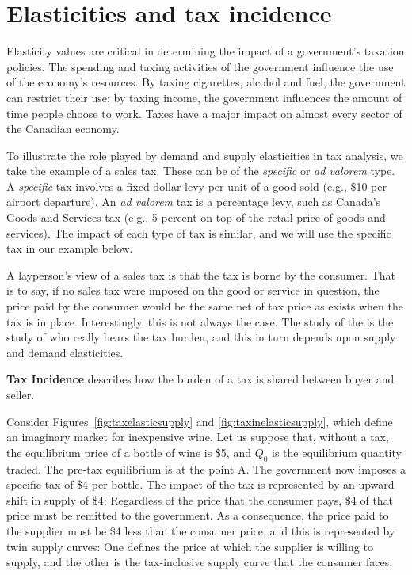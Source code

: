 \section{Elasticities and tax incidence}\label{sec:ch4sec7}

Elasticity values are critical in determining the impact of a government's
taxation policies. The spending and taxing activities of the government
influence the use of the economy's resources. By taxing cigarettes, alcohol
and fuel, the government can restrict their use; by taxing income, the
government influences the amount of time people choose to work. Taxes have a
major impact on almost every sector of the Canadian economy.

To illustrate the role played by demand and supply elasticities in tax
analysis, we take the example of a sales tax. These can be of the \textit{%
specific} or \textit{ad valorem} type. A \textit{specific} tax involves a
fixed dollar levy per unit of a good sold (e.g., \$10 per airport
departure). An \textit{ad valorem} tax is a percentage levy, such as
Canada's Goods and Services tax (e.g., 5 percent on top of the retail price
of goods and services). The impact of each type of tax is similar, and we
will use the specific tax in our example below.

A layperson's view of a sales tax is that the tax is borne by the consumer.
That is to say, if no sales tax were imposed on the good or service in
question, the price paid by the consumer would be the same net of tax price
as exists when the tax is in place. Interestingly, this is not always the
case. The study of the  is the study of who
really bears the tax burden, and this in turn depends upon supply and demand
elasticities.

\begin{DefBox}
\textbf{Tax Incidence} describes how the burden of a tax is shared between buyer and seller.
\end{DefBox}

\newhtmlpage

Consider Figures~\ref{fig:taxelasticsupply} and \ref{fig:taxinelasticsupply},
which define an imaginary market for inexpensive wine. Let us suppose
that, without a tax, the equilibrium price of a bottle of wine is \$5, and 
$Q_0$ is the equilibrium quantity traded. The pre-tax equilibrium is at
the point A. The government now imposes a specific tax of \$4 per
bottle. The impact of the tax is represented by an upward shift in supply of 
\$4: Regardless of the price that the consumer pays, \$4 of that price
must be remitted to the government. As a consequence, the price paid to the
supplier must be \$4 less than the consumer price, and this is represented
by twin supply curves: One defines the price at which the supplier is
willing to supply, and the other is the tax-inclusive supply curve that the
consumer faces.


